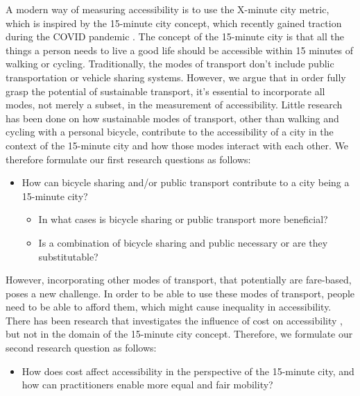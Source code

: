 A modern way of measuring accessibility is to use the X-minute city metric, which is inspired by the 15-minute city concept, which recently gained traction during the COVID pandemic \cite{morenoIntroducing15MinuteCity2021}.
The concept of the 15-minute city is that all the things a person needs to live a good life should be accessible within 15 minutes of walking or cycling.
Traditionally, the modes of transport don't include public transportation or vehicle sharing systems.
However, we argue that in order fully grasp the potential of sustainable transport, it's essential to incorporate all modes, not merely a subset, in the measurement of accessibility.
Little research has been done on how sustainable modes of transport, other than walking and cycling with a personal bicycle, contribute to the accessibility of a city in the context of the 15-minute city and how those modes interact with each other.
We therefore formulate our first research questions as follows:

\begin{itemize}
  \item How can bicycle sharing and/or public transport contribute to a city being a 15-minute city?
  \begin{itemize}
    \item In what cases is bicycle sharing or public transport more beneficial?
    \item Is a combination of bicycle sharing and public necessary or are they substitutable?
  \end{itemize}
\end{itemize}

However, incorporating other modes of transport, that potentially are fare-based, poses a new challenge.
In order to be able to use these modes of transport, people need to be able to afford them, which might cause inequality in accessibility.
There has been research that investigates the influence of cost on accessibility , but not in the domain of the 15-minute city concept.
Therefore, we formulate our second research question as follows:

\begin{itemize}
  \item How does cost affect accessibility in the perspective of the 15-minute city, and how can practitioners enable more equal and fair mobility?
\end{itemize}

